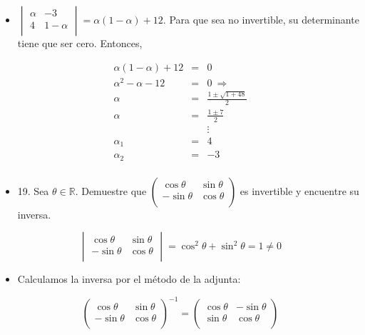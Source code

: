 \documentclass[
]{article}
\begin{document}
\begin{itemize}
\item
  \(\begin{vmatrix}
  \alpha & - 3 \\
  4 & 1 - \alpha \\
  \end{vmatrix} = \alpha(1 - \alpha) + 12\). Para que sea no invertible,
  su determinante tiene que ser cero. Entonces,
\end{itemize}

\[\begin{matrix}
\alpha(1 - \alpha) + 12 & = & 0 \\
\alpha^{2} - \alpha - 12 & = & 0\  \Rightarrow \\
\alpha & = & \frac{1 \pm \sqrt{1 + 48}}{2} \\
\alpha & = & \frac{1 \pm 7}{2} \\
 & & \vdots \\
\alpha_{1} & = & 4 \\
\alpha_{2} & = & - 3 \\
\end{matrix}\]

\begin{itemize}
\item
  19. Sea \(\theta \in \mathbb{R}\). Demuestre que \(\begin{pmatrix}
  \mathrm{\cos}\theta & \mathrm{\sin}\theta \\
   - \mathrm{\sin}\theta & \mathrm{\cos}\theta \\
  \end{pmatrix}\) es invertible y encuentre su inversa.
\end{itemize}

\[\begin{vmatrix}
\mathrm{\cos}\theta & \mathrm{\sin}\theta \\
 - \mathrm{\sin}\theta & \mathrm{\cos}\theta \\
\end{vmatrix} = \mathrm{\cos}^{2}\theta + \mathrm{\sin}^{2}\theta = 1 \neq 0\]

\begin{itemize}
\item
  Calculamos la inversa por el método de la adjunta:
\end{itemize}

\[\begin{pmatrix}
\mathrm{\cos}\theta & \mathrm{\sin}\theta \\
 - \mathrm{\sin}\theta & \mathrm{\cos}\theta \\
\end{pmatrix}^{- 1} = \begin{pmatrix}
\mathrm{\cos}\theta & - \mathrm{\sin}\theta \\
\mathrm{\sin}\theta & \mathrm{\cos}\theta \\
\end{pmatrix}\]
\end{document}
